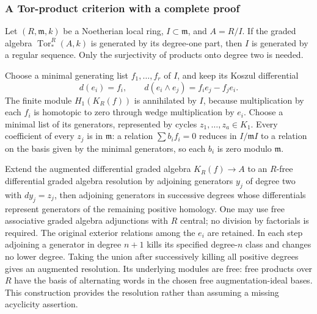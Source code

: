 \subsubsection{A Tor-product criterion with a complete proof}\label{a-tor-product-criterion-with-a-complete-proof}

Let \((R,\mathfrak m,k)\) be a Noetherian local ring, \(I\subset\mathfrak m\), and \(A=R/I\). If the graded algebra \(\operatorname{Tor}^R_*(A,k)\) is generated by its degree-one part, then \(I\) is generated by a regular sequence. Only the surjectivity of products onto degree two is needed.

Choose a minimal generating list \(f_1,\ldots,f_r\) of \(I\), and keep its Koszul differential \[
d(e_i)=f_i,\qquad d(e_i\wedge e_j)=f_i e_j-f_j e_i.
\] The finite module \(H_1(K_R(f))\) is annihilated by \(I\), because multiplication by each \(f_i\) is homotopic to zero through wedge multiplication by \(e_i\). Choose a minimal list of its generators, represented by cycles \(z_1,\ldots,z_a\in K_1\). Every coefficient of every \(z_j\) is in \(\mathfrak m\): a relation \(\sum b_i f_i=0\) reduces in \(I/\mathfrak mI\) to a relation on the basis given by the minimal generators, so each \(b_i\) is zero modulo \(\mathfrak m\).

Extend the augmented differential graded algebra \(K_R(f)\to A\) to an \(R\)-free differential graded algebra resolution by adjoining generators \(y_j\) of degree two with \(dy_j=z_j\), then adjoining generators in successive degrees whose differentials represent generators of the remaining positive homology. One may use free associative graded algebra adjunctions with \(R\) central; no division by factorials is required. The original exterior relations among the \(e_i\) are retained. In each step adjoining a generator in degree \(n+1\) kills its specified degree-\(n\) class and changes no lower degree. Taking the union after successively killing all positive degrees gives an augmented resolution. Its underlying modules are free: free products over \(R\) have the basis of alternating words in the chosen free augmentation-ideal bases. This construction provides the resolution rather than assuming a missing acyclicity assertion.

